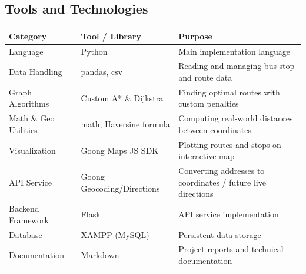 \subsection{Tools and Technologies}

\begin{center}
\begin{tabular}{|l|l|p{7cm}|}
\hline
\textbf{Category} & \textbf{Tool / Library} & \textbf{Purpose} \\ \hline
Language & Python & Main implementation language \\ \hline
Data Handling & pandas, csv & Reading and managing bus stop and route data \\ \hline
Graph Algorithms & Custom A* \& Dijkstra & Finding optimal routes with custom penalties \\ \hline
Math \& Geo Utilities & math, Haversine formula & Computing real-world distances between coordinates \\ \hline
Visualization & Goong Maps JS SDK & Plotting routes and stops on interactive map \\ \hline
API Service & Goong Geocoding/Directions & Converting addresses to coordinates / future live directions \\ \hline
Backend Framework & Flask & API service implementation \\ \hline
Database & XAMPP (MySQL) & Persistent data storage \\ \hline
Documentation & Markdown & Project reports and technical documentation \\ \hline
\end{tabular}
\end{center}



